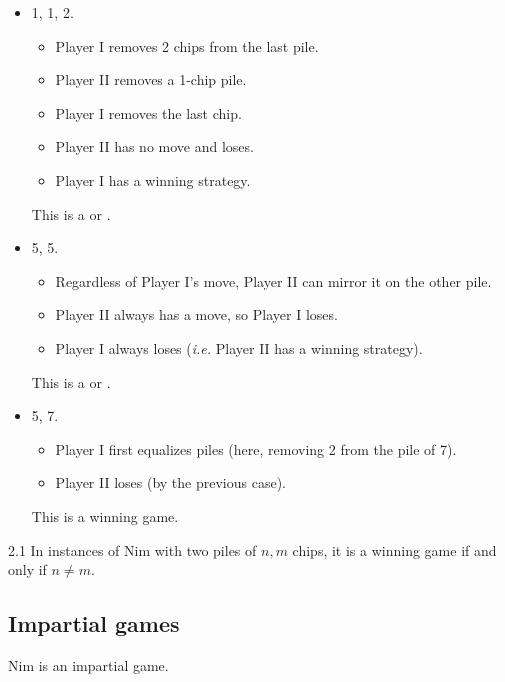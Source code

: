 \documentclass[12pt,letterpaper]{report}
\begin{document}
\begin{ex}
  \begin{itemize}
    \item
      1, 1, 2.
      \begin{itemize}
        \item Player I removes 2 chips from the last pile.
        \item Player II removes a 1-chip pile.
        \item Player I removes the last chip.
        \item Player II has no move and loses.
        \item Player I has a winning strategy.
      \end{itemize}
      This is a  or .
    \item
      5, 5.
      \begin{itemize}
        \item Regardless of Player I's move, Player II can mirror it on the other pile.
        \item Player II always has a move, so Player I loses.
        \item Player I always loses (\emph{i.e.} Player II has a winning strategy).
      \end{itemize}
      This is a  or .
    \item
      5, 7.
      \begin{itemize}
        \item Player I first equalizes piles (here, removing 2 from the pile of 7).
        \item Player II loses (by the previous case).
      \end{itemize}
      This is a winning game.
  \end{itemize}
\end{ex}

\begin{lem}{}{2.1}
  In instances of Nim with two piles of $n, m$ chips, it is a winning game if and only if
  $n \neq m$.
\end{lem}

\pagebreak
\subsection{Impartial games}

Nim is an impartial game.
\end{document}
